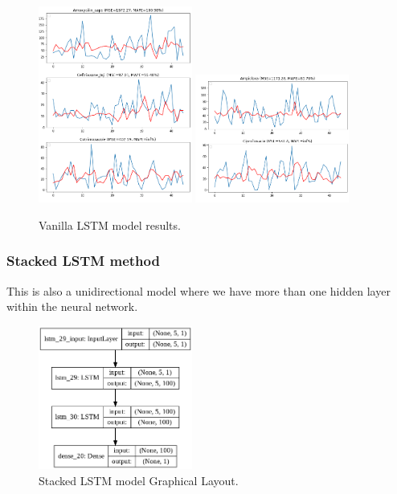 \documentclass[12pt]{report}
\begin{document}
  \begin{figure}[H]%
  \begin {center}
  \includegraphics[width=0.45\textwidth]{images/vanilla1 (2).png}
  \includegraphics[width=0.45\textwidth]{images/vanilla1 (4).png}
  \caption{Vanilla LSTM model results.}
  \label{fig:ecg}
  \end {center}
  \end{figure}
  
  
 

  \subsubsection{Stacked LSTM method}

This is also a unidirectional model where we have more than one hidden layer within the neural network.
\begin{figure}[H]%
\begin {center}
\includegraphics[width=0.45\textwidth]{StackedLstm.png}
\caption{Stacked LSTM model Graphical Layout.}
\label{fig:ecg}
\end {center}
\end{figure}
\end{document}
